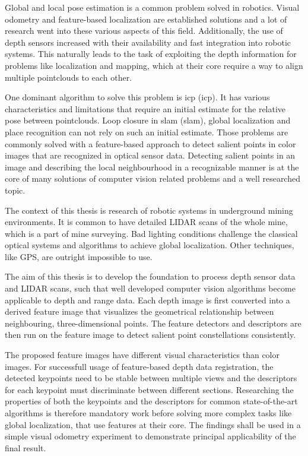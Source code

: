 Global and local pose estimation is a common problem solved in robotics.
Visual odometry\cite{he_tvc2019} and \gls{feature}-based localization\cite{sattler_cvpr2018} are established solutions and a lot of research went into these various aspects of this field.
Additionally, the use of depth sensors increased with their availability and fast integration into robotic systems.
This naturally leads to the task of exploiting the depth information for problems like localization and mapping, which at their core require a way to align multiple pointclouds to each other.

One dominant algorithm to solve this problem is \acrshort{icp} (\acrlong{icp})\cite{besl_pami1992}.
It has various characteristics and limitations that require an initial estimate for the relative pose between pointclouds\cite{rusinkiewicz_ieee2001}.
Loop closure in \acrshort{slam} (\acrlong{slam})\cite{ho_ros2006}, global localization and place recognition\cite{sattler_2011} can not rely on such an initial estimate.
Those problems are commonly solved with a \gls{feature}-based approach to detect salient points in color images that are recognized in optical sensor data.
Detecting salient points in an image and describing the local neighbourhood in a recognizable manner is at the core of many solutions of computer vision related problems and a well researched topic\cite{andersson_2016}.

The context of this thesis is research of robotic systems in underground mining environments.
It is common to have detailed \acrshort{LIDAR} scans of the whole mine, which is a part of mine surveying.
Bad lighting conditions challenge the classical optical systems and algorithms to achieve global localization.
Other techniques, like GPS, are outright impossible to use.

The aim of this thesis is to develop the foundation to process depth sensor data and \acrshort{LIDAR} scans, such that well developed computer vision algorithms become applicable to depth and range data.
Each depth image is first converted into a derived feature image that visualizes the geometrical relationship between neighbouring, three-dimensional points.
The \gls{feature} detectors and descriptors are then run on the feature image to detect salient point constellations consistently.

The proposed feature images have different visual characteristics than color images.
For successfull usage of \gls{feature}-based depth data registration, the detected keypoints need to be stable between multiple views and the descriptors for each keypoint must discriminate between different sections.
Researching the properties of both the keypoints and the descriptors for common state-of-the-art algorithms is therefore mandatory work before solving more complex tasks like global localization, that use \glspl{feature} at their core.
The findings shall be used in a simple visual odometry experiment to demonstrate principal applicability of the final result.

